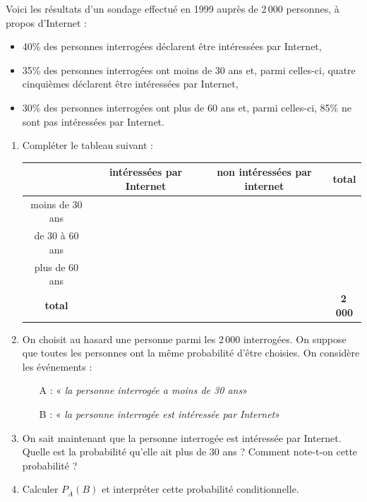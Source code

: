 \documentclass[a4paper,11pt,exos]{nsi} %
\begin{document}
\newpage
{}

Voici les résultats d'un sondage effectué en 1999 auprès de 2\,000 personnes, à propos d'Internet : 
\begin{itemize}
	\item 40\% des personnes interrogées déclarent être intéressées par Internet, 
	\item 35\% des personnes interrogées ont moins de 30 ans et, parmi celles-ci, quatre cinquièmes déclarent être intéressées par Internet, 
	\item 30\% des personnes interrogées ont plus de 60 ans et, parmi celles-ci, 85\% ne sont pas intéressées par Internet. 
\end{itemize} 
\begin{enumerate}
	\item Compléter le tableau suivant :
	\begin{center}
		\begin{tabular}{|c|c|c|c|}
			\hline 
			& intéressées par Internet & non intéressées par internet & \textbf{total} \\
			\hline 
			moins de 30 ans & & & \\
			\hline 
			de 30 à 60 ans & & & \\
			\hline 
			plus de 60 ans & & & \\
			\hline 
			\textbf{total} & & & \textbf{2\,000} \\
			\hline 
		\end{tabular} 
	\end{center}
	\item On choisit au hasard une personne parmi les 2\,000 interrogées. On suppose que toutes les personnes ont la même probabilité d'être choisies. On considère les événements :
	\begin{itemize} 
		\item[A :]« {\sl la personne interrogée a moins de 30 ans}»
		\item[B :] « {\sl la personne interrogée est intéressée par Internet}»
	\end{itemize}
	\item On sait maintenant que la personne interrogée est intéressée par Internet.\\               
	Quelle est la probabilité qu'elle ait plus de 30 ans ? Comment note-t-on cette probabilité ?
	\item Calculer $P_{\overline{A}}(B)$ et interpréter cette probabilité conditionnelle.\\
\end{enumerate} 
\end{document}

